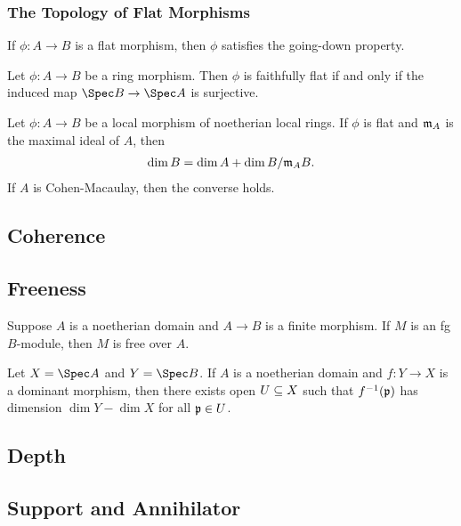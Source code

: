 \documentclass[10pt,final,oneside]{amsbook}
\numberwithin{equation}{section}
\begin{document}
\subsubsection{The Topology of Flat Morphisms}

\begin{prop}
If $\phi : A \to B$ is a flat morphism, then $\phi$ satisfies the going-down property.
\end{prop}

\begin{prop}
Let $\phi : A \to B$ be a ring morphism.
Then $\phi$ is faithfully flat if and only if the induced map $\Spec B \to \Spec A$ is surjective.
\end{prop}

\begin{thm}
Let $\phi : A \to B$ be a local morphism of noetherian local rings.
If $\phi$ is flat and $\mathfrak{m}_A$ is the maximal ideal of $A$, then 
\begin{align}
\dim B = \dim A + \dim B/\mathfrak{m}_AB.
\end{align}
If $A$ is Cohen-Macaulay, then the converse holds.
\end{thm}

\subsection{Coherence}

\subsection{Freeness}


\begin{thm}
Suppose $A$ is a noetherian domain and $A \to B$ is a finite morphism.
If $M$ is an fg $B$-module, then $M$ is free over $A$.
\end{thm}

\begin{cor}
Let $X = \Spec A$ and $Y = \Spec B$.
If $A$ is a noetherian domain and $f : Y \to X$ is a dominant morphism, then there exists open $U \subseteq X$ such that $f^{-1}(\mathfrak{p})$ has dimension $\dim Y - \dim X$ for all $\mathfrak{p} \in U$.
\end{cor}

\subsection{Depth}

\subsection{Support and Annihilator}
\end{document}
